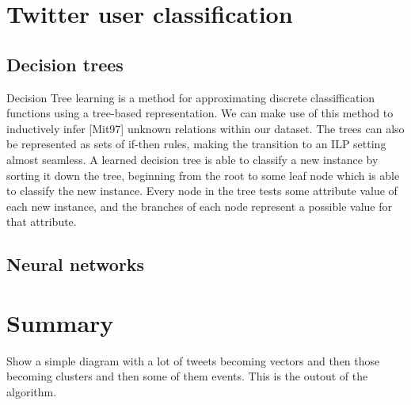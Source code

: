 \section{Twitter user classification}


\subsection{Decision trees}
Decision Tree learning is a method for approximating discrete classiffication functions using a tree-based representation. We can make use of this method to inductively infer [Mit97] unknown relations within our dataset. The trees can also be represented as sets of if-then rules, making the transition to an ILP setting almost seamless. A learned decision tree is able to classify a new instance by sorting it down the tree, beginning from the root to some leaf node which is able to classify the new instance. Every node in the tree tests some attribute value of each new instance, and the branches of each node represent a possible value for that attribute.

\subsection{Neural networks}

\section{Summary}

Show a simple diagram with a lot of tweets becoming vectors and then those becoming clusters and then some of them events.
This is the outout of the algorithm.


